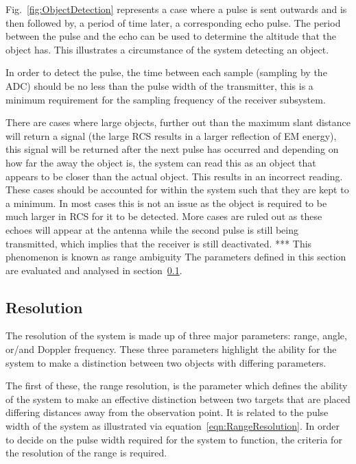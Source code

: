 \documentclass[11pt]{witseiepaper}
\begin{document}
Fig.~\ref{fig:ObjectDetection} represents a case where a pulse is sent outwards and is then followed by, a period of time later, a corresponding echo pulse.
The period between the pulse and the echo can be used to determine the altitude that the object has. This illustrates a circumstance of the system detecting an object. 


In order to detect the pulse, the time between each sample (sampling by the ADC) should be no less than the pulse width of the transmitter, this is a minimum requirement for the sampling frequency of the receiver subsystem.

There are cases where large objects, further out than the maximum slant distance will return a signal (the large RCS results in a larger reflection of EM energy), this signal will be returned after the next pulse has occurred and depending on how far the away the object is, the system can read this as an object that appears to be closer than the actual object. This results in an incorrect reading. These cases should be accounted for within the system such that they are kept to a minimum. In most cases this is not an issue as the object is required to be much larger in RCS for it to be detected. More cases are ruled out as these echoes will appear at the antenna while the second pulse is still being transmitted, which implies that the receiver is still deactivated. ***
This phenomenon is known as range ambiguity \cite[p.~22]{radarHandbook}
The parameters defined in this section are evaluated and analysed in section~\ref{sec:Resolution}.

\subsection{Resolution} \label{sec:Resolution}
The resolution of the system is made up of three major parameters: range, angle, or/and Doppler frequency. These three parameters highlight the ability for the system to make a distinction between two objects with differing parameters.

The first of these, the range resolution, is the parameter which defines the ability of the system to make an  effective distinction between two targets that are placed differing distances away from the observation point. It is related to the pulse width of the system as illustrated via equation~\ref{eqn:RangeResolution}. In order to decide on the pulse width required for the system to function, the criteria for the resolution of the range is required.
\end{document}
